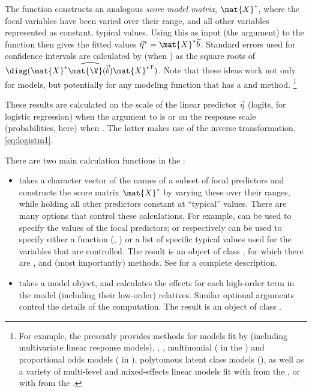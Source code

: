 \documentclass[11pt]{book}
\begin{document}
The  function constructs an analogous \emph{score model matrix},
$\mat{X}^*$, where the focal variables have been varied over their range,
and all other variables represented as constant, typical values.
Using this as input (the  argument)
to the  function then gives the 
fitted values $\vec{\eta}^* = \mat{X}^* \vec{b}$.
Standard errors used for confidence intervals are calculated by
 (when ) as the square roots of
$\diag (\mat{X}^* \widehat{\mat{\V} (\vec{b})} \mat{X}^{*\mathsf{T}} )$.
Note that these ideas work not only for  models, but potentially for
any modeling function that has a  and  method.%
\footnote{
For example, the  presently provides methods for models fit by
 (including multivariate linear response models), ,
, multinomial ( in the )
and proportional odds models ( in ),
polytomous latent class models (), as well as
a variety of multi-level and mixed-effects linear models fit with
 from the , or with  from the .
}

These results are calculated on the scale of the linear predictor $\vec{\eta}$
(logits, for logistic regression) when the  argument to
 is  or on the response scale
(probabilities, here) when .  The latter makes use
of the inverse transformation, \eqref{eq:logistm1}.  

There are two main calculation functions in the :

\begin{itemize}
\item {} takes a character vector of the names of a subset of focal predictors
and constructs the score matrix $\mat{X}^*$ by varying these over their ranges,
while holding all other predictors constant at ``typical'' values.
There are many options that control these calculations. For example,
 can be used to specify the values of the focal predictors; 
 or  respectively can be used to specify either a
function (, ) or a list of specific typical values
used for the variables that are controlled.
The result is an object of class , for which there are ,
 and (most importantly)  methods.  See 
for a complete description.

\item {} takes a model object, and calculates the effects for each
high-order term in the model (including their low-order) relatives.  Similar
optional arguments control the details of the computation. 
The result is an object of class .
\end{itemize}
\end{document}
